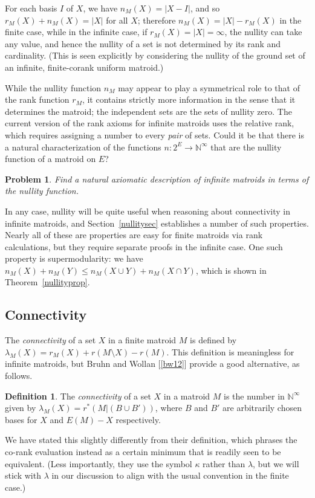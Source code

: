 \documentclass{amsart}
\theoremstyle{plain}
\newtheorem{problem}[theorem]{Problem}
\newcounter{defn}
\theoremstyle{definition}
\newtheorem{definition}[defn]{Definition}
\newcommand{\enn}{\mathbb{N}^{\infty}}
\newcommand{\del}{\!\setminus\!}
\renewcommand{\le}{\leqslant}
\begin{document}
For each basis $I$ of $X$, we have $n_M(X) = |X - I|$, 
and so $r_M(X) + n_M(X) = |X|$ for all $X$;
therefore $n_M(X) = |X| - r_M(X)$ in the finite case, while 
in the infinite case, if $r_M(X) = |X| = \infty$, the nullity can take any value, 
and hence the nullity of a set is not determined by its rank and cardinality. 
(This is seen explicitly by considering the nullity of the ground set of an infinite, 
finite-corank uniform matroid.) 

While the nullity function $n_M$ may appear
to play a symmetrical role to that of the rank function $r_M$, 
it contains strictly more information in the sense that it determines the matroid;
the independent sets are the sets of nullity zero.
The current version of the rank axioms for infinite matroids uses the relative 
rank, which requires assigning a number to every \emph{pair} of sets. 
Could it be that there is a natural characterization of the functions $n : 2^E \to \enn$
that are the nullity function of a matroid on $E$? 

\begin{problem}
  Find a natural axiomatic description of infinite matroids in terms of the nullity function. 
\end{problem}

In any case,
nullity will be quite useful when reasoning about connectivity in infinite matroids, 
and Section~\ref{nullitysec} establishes a number of such properties. 
Nearly all of these are properties are easy for finite matroids via 
rank calculations, but they require separate proofs in the infinite case. 
One such property is supermodularity: we have $n_M(X) + n_M(Y) \le n_M(X \cup Y) + n_M(X \cap Y)$, which is shown in Theorem~\ref{nullityprop}. 


\subsection*{Connectivity}

The \emph{connectivity} of a set $X$ in a finite matroid $M$ is defined by $\lambda_M(X) = r_M(X) + r(M \del X) - r(M)$. 
This definition is meaningless for infinite matroids, but Bruhn and Wollan [\ref{bw12}] provide 
a good alternative, as follows.

\begin{definition}\label{bwdef}
  The \emph{connectivity} of a set $X$ in a matroid $M$ is the
  number in $\enn$ given by 
  $\lambda_M(X) = r^*(M | (B \cup B'))$, 
  where $B$ and $B'$ are arbitrarily chosen bases for $X$ and $E(M) - X$ respectively. 
\end{definition}
We have stated this slightly differently from their definition, which phrases the co-rank evaluation instead 
as a certain minimum that is readily seen to be equivalent. 
(Less importantly, they use the  symbol $\kappa$ rather than $\lambda$, 
but we will stick with $\lambda$ in our discussion to align with the usual convention in the finite case.)
\end{document}
